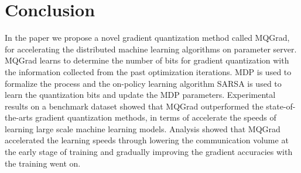 \documentclass[sigconf]{acmart}
\begin{document}



\section{Conclusion}
In the paper we propose a novel gradient quantization method called MQGrad, for accelerating the distributed machine learning algorithms on parameter server. MQGrad learns to determine the number of bits for gradient quantization with the information collected from the past optimization iterations. MDP is used to formalize the process and the on-policy learning algorithm SARSA is used to learn the quantization bits and update the MDP parameters. Experimental results on a benchmark dataset showed that MQGrad outperformed the state-of-the-arts gradient quantization methods, in terms of accelerate the speeds of learning large scale machine learning models. Analysis showed that MQGrad accelerated the learning speeds through lowering the communication volume at the early stage of training and gradually improving the gradient accuracies with the training went on.


%
%


%
%



%
%
\end{document}
